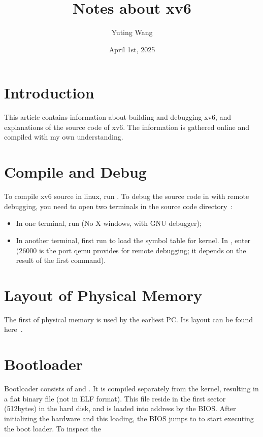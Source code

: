 \documentclass{article}
\title{Notes about xv6}
\author{Yuting Wang}
\date{April 1st, 2025}
\begin{document}
\maketitle

\section{Introduction}

This article contains information about building and debugging xv6,
and explanations of the source code of xv6. The information is
gathered online and compiled with my own understanding.

\section{Compile and Debug}

To compile xv6 source in linux, run . To debug the source
code in  with remote debugging, you need to open two
terminals in the source code directory~\cite{xv6-debug}:

\begin{itemize}
\item In one terminal, run  (No X windows,
  with GNU debugger);

\item In another terminal, first run  to load the
  symbol table for kernel. In , enter  (26000 is the port qemu provides for remote
  debugging; it depends on the result of the first command).
\end{itemize}

\section{Layout of Physical Memory}

The first  of physical memory is used by the earliest
PC. Its layout can be found here~\cite{yale-cs422-as1}.

\section{Bootloader}

Bootloader consists of  and . It is
compiled separately from the kernel, resulting in a flat binary file
 (not in ELF format). This file reside in the first
sector (512bytes) in the hard disk, and is loaded into address
\code{[0x7c00 - 0x7dff]} by the BIOS. After initializing the hardware
and this loading, the BIOS jumps to  to start executing
the boot loader. To inspect the 



\end{document}
